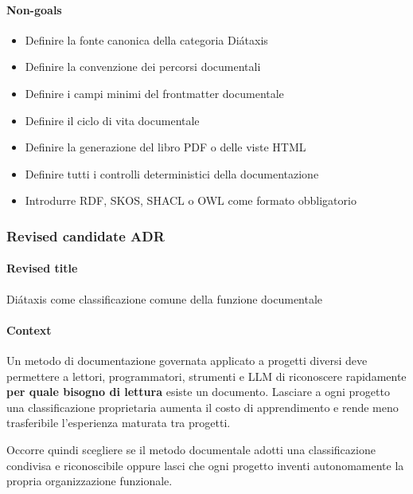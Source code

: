 \documentclass[
  10pt,
]{article}
\providecommand{\tightlist}{%
  \setlength{\itemsep}{0pt}\setlength{\parskip}{0pt}}
\begin{document}
\paragraph{Non-goals}\label{non-goals}

\begin{itemize}
\tightlist
\item
  Definire la fonte canonica della categoria Diátaxis
\item
  Definire la convenzione dei percorsi documentali
\item
  Definire i campi minimi del frontmatter documentale
\item
  Definire il ciclo di vita documentale
\item
  Definire la generazione del libro PDF o delle viste HTML
\item
  Definire tutti i controlli deterministici della documentazione
\item
  Introdurre RDF, SKOS, SHACL o OWL come formato obbligatorio
\end{itemize}

\subsubsection{Revised candidate ADR}\label{revised-candidate-adr}

\paragraph{Revised title}\label{revised-title}

Diátaxis come classificazione comune della funzione documentale

\paragraph{Context}\label{context-1}

Un metodo di documentazione governata applicato a progetti diversi deve
permettere a lettori, programmatori, strumenti e LLM di riconoscere
rapidamente \textbf{per quale bisogno di lettura} esiste un documento.
Lasciare a ogni progetto una classificazione proprietaria aumenta il
costo di apprendimento e rende meno trasferibile l'esperienza maturata
tra progetti.

Occorre quindi scegliere se il metodo documentale adotti una
classificazione condivisa e riconoscibile oppure lasci che ogni progetto
inventi autonomamente la propria organizzazione funzionale.
\end{document}
